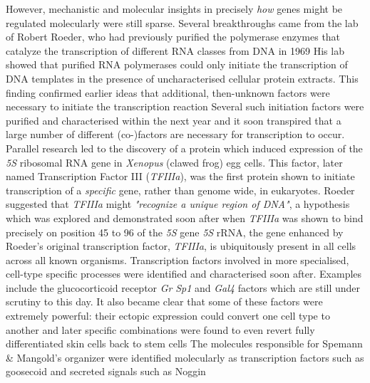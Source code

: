 However, mechanistic and molecular insights in precisely \textit{how} genes might be regulated molecularly were still sparse. Several breakthroughs came from the lab of Robert Roeder, who had previously purified the polymerase enzymes that catalyze the transcription of different RNA classes from DNA in 1969 His lab showed that purified RNA polymerases could only initiate the transcription of DNA templates in the presence of uncharacterised cellular protein extracts. This finding confirmed earlier ideas that additional, then-unknown factors were necessary to initiate the transcription reaction Several such initiation factors were purified and characterised within the next year and it soon transpired that a large number of different (co-)factors are necessary for transcription to occur. Parallel research led to the discovery of a protein which induced expression of the \textit{5S} ribosomal RNA gene in \textit{Xenopus} (clawed frog) egg cells. This factor, later named Transcription Factor III (\textit{TFIIIa}), was the first protein shown to initiate transcription of a \textit{specific} gene, rather than genome wide, in eukaryotes. Roeder suggested that \textit{TFIIIa} might \textit{"recognize a unique region of DNA"}, a hypothesis which was explored and demonstrated soon after when \textit{TFIIIa} was shown to bind precisely on position 45 to 96 of the \textit{5S} gene \textit{5S} rRNA, the gene enhanced by Roeder's original transcription factor, \textit{TFIIIa}, is ubiquitously present in all cells across all known organisms. Transcription factors involved in more specialised, cell-type specific processes were identified and characterised soon after. Examples include the glucocorticoid receptor \textit{Gr} \textit{Sp1} and \textit{Gal4} factors which are still under scrutiny to this day. It also became clear that some of these factors were extremely powerful: their ectopic expression could convert one cell type to another and later specific combinations were found to even revert fully differentiated skin cells back to stem cells The molecules responsible for Spemann \& Mangold's organizer were identified molecularly as transcription factors such as goosecoid and secreted signals such as Noggin

